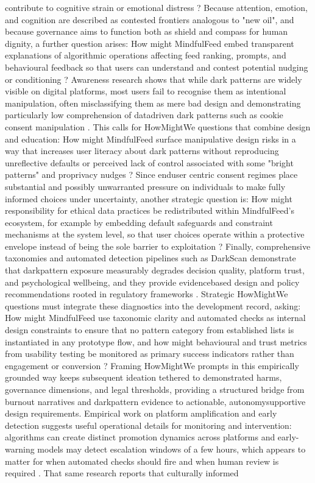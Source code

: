 \documentclass{article}
\begin{document}
contribute to cognitive strain or emotional distress \parencites[3]{7808872}[8]{7808872}? Because attention, emotion, and cognition are described as contested frontiers analogous to "new oil", and because governance aims to function both as shield and compass for human dignity, a further question arises: How might MindfulFeed embed transparent explanations of algorithmic operations affecting feed ranking, prompts, and behavioural feedback so that users can understand and contest potential nudging or conditioning \parencites[3]{7808872}? Awareness research shows that while dark patterns are widely visible on digital platforms, most users fail to recognise them as intentional manipulation, often misclassifying them as mere bad design and demonstrating particularly low comprehension of data\-driven dark patterns such as cookie consent manipulation \parencites[2]{5127387}. This calls for How\-Might\-We questions that combine design and education: How might MindfulFeed surface manipulative design risks in a way that increases user literacy about dark patterns without reproducing unreflective defaults or perceived lack of control associated with some "bright patterns" and pro\-privacy nudges \parencites[15]{5678011}[2]{5127387}? Since end\-user centric consent regimes place substantial and possibly unwarranted pressure on individuals to make fully informed choices under uncertainty, another strategic question is: How might responsibility for ethical data practices be redistributed within MindfulFeed's ecosystem, for example by embedding default safeguards and constraint mechanisms at the system level, so that user choices operate within a protective envelope instead of being the sole barrier to exploitation \parencites[4]{5678011}[3]{7808872}? Finally, comprehensive taxonomies and automated detection pipelines such as DarkScan demonstrate that dark\-pattern exposure measurably degrades decision quality, platform trust, and psychological wellbeing, and they provide evidence\-based design and policy recommendations rooted in regulatory frameworks \parencites[2]{4807303}. Strategic How\-Might\-We questions must integrate these diagnostics into the development record, asking: How might MindfulFeed use taxonomic clarity and automated checks as internal design constraints to ensure that no pattern category from established lists is instantiated in any prototype flow, and how might behavioural and trust metrics from usability testing be monitored as primary success indicators rather than engagement or conversion \parencites[2]{4807303}[2]{5127387}? Framing How\-Might\-We prompts in this empirically grounded way keeps subsequent ideation tethered to demonstrated harms, governance dimensions, and legal thresholds, providing a structured bridge from burnout narratives and dark\-pattern evidence to actionable, autonomy\-supportive design requirements. Empirical work on platform amplification and early detection suggests useful operational details for monitoring and intervention: algorithms can create distinct promotion dynamics across platforms and early-warning models may detect escalation windows of a few hours, which appears to matter for when automated checks should fire and when human review is required \parencites[11]{8597215}. That same research reports that culturally informed 
\end{document}
